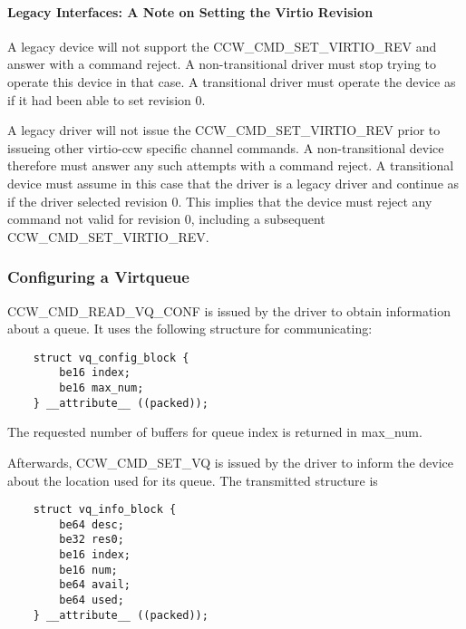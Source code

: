 \paragraph{Legacy Interfaces: A Note on Setting the Virtio Revision}\label{sec:Virtio Transport Options / Virtio over channel I/O / Device Initialization / Setting the Virtio Revision / Legacy Interfaces: A Note on Setting the Virtio Revision}

A legacy device will not support the CCW_CMD_SET_VIRTIO_REV and answer
with a command reject. A non-transitional driver must stop trying to
operate this device in that case. A transitional driver must operate
the device as if it had been able to set revision 0.

A legacy driver will not issue the CCW_CMD_SET_VIRTIO_REV prior to
issueing other virtio-ccw specific channel commands. A non-transitional
device therefore must answer any such attempts with a command reject.
A transitional device must assume in this case that the driver is a
legacy driver and continue as if the driver selected revision 0. This
implies that the device must reject any command not valid for revision
0, including a subsequent CCW_CMD_SET_VIRTIO_REV.

\subsubsection{Configuring a Virtqueue}\label{sec:Virtio Transport Options / Virtio over channel I/O / Device Initialization / Configuring a Virtqueue}

CCW_CMD_READ_VQ_CONF is issued by the driver to obtain information
about a queue. It uses the following structure for communicating:

\begin{lstlisting}
	struct vq_config_block {
		be16 index;
		be16 max_num;
	} __attribute__ ((packed));
\end{lstlisting}

The requested number of buffers for queue index is returned in
max_num.

Afterwards, CCW_CMD_SET_VQ is issued by the driver to inform the
device about the location used for its queue. The transmitted
structure is

\begin{lstlisting}
	struct vq_info_block {
		be64 desc;
		be32 res0;
		be16 index;
		be16 num;
		be64 avail;
		be64 used;
	} __attribute__ ((packed));
\end{lstlisting}

